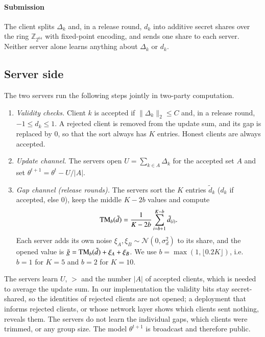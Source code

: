 \paragraph{Submission}
The client splits $\Delta_k$ and, in a release round, $d_k$ into additive secret shares over the ring $\mathbb{Z}_{2^{64}}$ with fixed-point encoding, and sends one share to each server. Neither server alone learns anything about $\Delta_k$ or $d_k$.

\subsection{Server side}
The two servers run the following steps jointly in two-party computation.
\begin{enumerate}
\item \emph{Validity checks.} Client $k$ is accepted if $\|\Delta_k\|_2\le C$ and, in a release round, $-1\le d_k\le1$. A rejected client is removed from the update sum, and its gap is replaced by $0$, so that the sort always has $K$ entries. Honest clients are always accepted.
\item \emph{Update channel.} The servers open $U=\sum_{k\in A}\Delta_k$ for the accepted set $A$ and set $\theta^{t+1}=\theta^t-U/|A|$.
\item \emph{Gap channel (release rounds).} The servers sort the $K$ entries $\tilde d_k$ ($d_k$ if accepted, else $0$), keep the middle $K-2b$ values and compute
\begin{equation}\label{eq:tm}
\mathrm{TM}_b(\tilde d)=\frac{1}{K-2b}\sum_{i=b+1}^{K-b}\tilde d_{(i)} .
\end{equation}
Each server adds its own noise $\xi_A,\xi_B\sim\mathcal{N}(0,\sigma_d^2)$ to its share, and the opened value is $\tilde g=\mathrm{TM}_b(\tilde d)+\xi_A+\xi_B$. We use $b=\max(1,\lfloor0.2K\rfloor)$, i.e.\ $b=1$ for $K=5$ and $b=2$ for $K=10$.
\end{enumerate}
The servers learn $U$, $\gt$ and the number $|A|$ of accepted clients, which is needed to average the update sum. In our implementation the validity bits stay secret-shared, so the identities of rejected clients are not opened; a deployment that informs rejected clients, or whose network layer shows which clients sent nothing, reveals them. The servers do not learn the individual gaps, which clients were trimmed, or any group size. The model $\theta^{t+1}$ is broadcast and therefore public.

